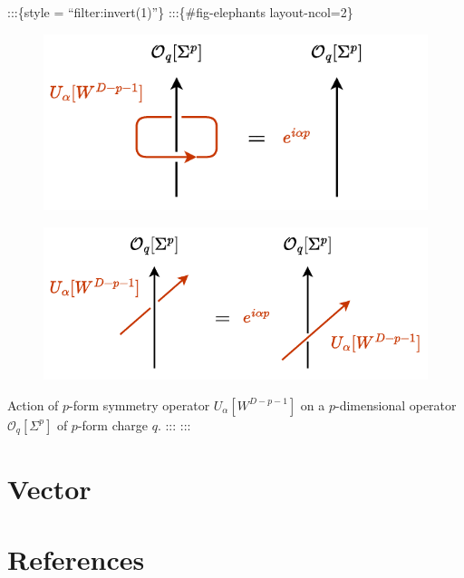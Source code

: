 \documentclass[
  letterpaper,
  DIV=11,
  numbers=noendperiod]{scrreport}
\begin{document}
:::\{style = ``filter:invert(1)''\} :::\{\#fig-elephants layout-ncol=2\}

\begin{figure}[t]

{\centering \includegraphics{figures/one-form_act.pdf}

}

\end{figure}

\begin{figure}[t]

{\centering \includegraphics{figures/one_form_passing.pdf}

}

\end{figure}

Action of \(p\)-form symmetry operator \(U_\alpha[W^{D-p-1}]\) on a
\(p\)-dimensional operator \(\mathcal{O}_q[\Sigma^p]\) of \(p\)-form
charge \(q\). ::: :::


\hypertarget{sec-vector}{%
\chapter{Vector}\label{sec-vector}}


\hypertarget{references}{%
\chapter*{References}\label{references}}


\printbibliography[heading=none]
\end{document}
